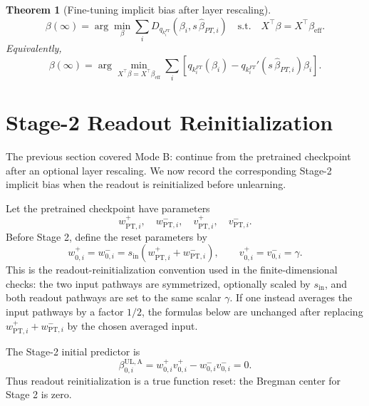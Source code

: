 \documentclass[11pt]{article}
\newtheorem{theorem}{Theorem}
\begin{document}
\begin{theorem}[Fine-tuning implicit bias after layer rescaling]
\begin{equation}
    \boxed{
    \beta(\infty)
    =
    \arg\min_{\beta}
    \sum_i
    D_{q_{k_i^{FT}}}
    \!\left(
        \beta_i,
        s\,\widehat\beta_{PT,i}
    \right)
    \quad
    \text{s.t.}
    \quad
    X^\top\beta=X^\top\beta_{\mathrm{eff}}
    }.
\end{equation}
Equivalently,
\begin{equation}
    \beta(\infty)
    =
    \arg\min_{X^\top\beta=X^\top\beta_{\mathrm{eff}}}
    \sum_i
    \left[
    q_{k_i^{FT}}(\beta_i)
    -
    q_{k_i^{FT}}'\!\left(s\,\widehat\beta_{PT,i}\right)\beta_i
    \right].
\end{equation}
\end{theorem}

\section{Stage-2 Readout Reinitialization}

The previous section covered Mode B: continue from the pretrained checkpoint
after an optional layer rescaling.  We now record the corresponding Stage-2
implicit bias when the readout is reinitialized before unlearning.

Let the pretrained checkpoint have parameters
\begin{equation}
    w_{\mathrm{PT},i}^{+},
    \quad
    w_{\mathrm{PT},i}^{-},
    \quad
    v_{\mathrm{PT},i}^{+},
    \quad
    v_{\mathrm{PT},i}^{-}.
\end{equation}
Before Stage 2, define the reset parameters by
\begin{equation}
    w_{0,i}^{+}
    =
    w_{0,i}^{-}
    =
    s_{\mathrm{in}}
    \left(
        w_{\mathrm{PT},i}^{+}
        +
        w_{\mathrm{PT},i}^{-}
    \right),
    \qquad
    v_{0,i}^{+}
    =
    v_{0,i}^{-}
    =
    \gamma .
\end{equation}
This is the readout-reinitialization convention used in the finite-dimensional
checks: the two input pathways are symmetrized, optionally scaled by
\(s_{\mathrm{in}}\), and both readout pathways are set to the same scalar
\(\gamma\).  If one instead averages the input pathways by a factor \(1/2\),
the formulas below are unchanged after replacing
\(w_{\mathrm{PT},i}^{+}+w_{\mathrm{PT},i}^{-}\) by the chosen averaged input.

The Stage-2 initial predictor is
\begin{equation}
    \beta_{0,i}^{\mathrm{UL,A}}
    =
    w_{0,i}^{+}v_{0,i}^{+}
    -
    w_{0,i}^{-}v_{0,i}^{-}
    =
    0.
\end{equation}
Thus readout reinitialization is a true function reset: the Bregman center for
Stage 2 is zero.
\end{document}
